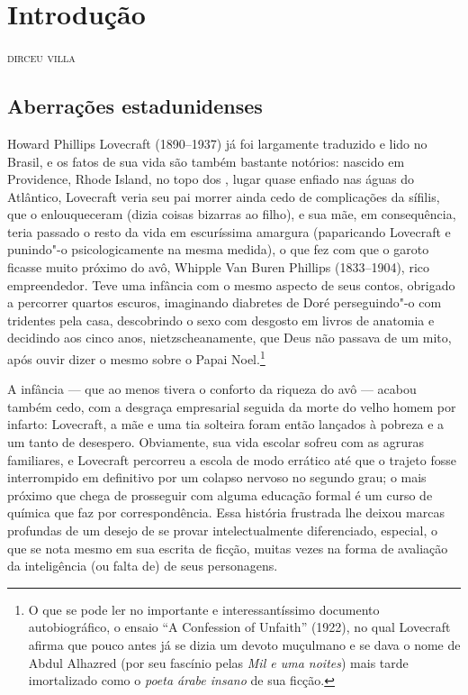 
\chapter[Introdução, \emph{por Dirceu Villa}]{Introdução}


\hfill\textsc{dirceu villa}

\bigskip

\section{Aberrações estadunidenses}

Howard Phillips Lovecraft (1890--1937) já foi largamente traduzido e lido
no Brasil, e os fatos de sua vida são também bastante notórios: nascido
em Providence, Rhode Island, no topo dos , lugar quase enfiado nas
águas do Atlântico, Lovecraft veria seu pai morrer ainda cedo de
complicações da sífilis, que o enlouqueceram (dizia coisas bizarras ao
filho), e sua mãe, em consequência, teria passado o resto da vida em
escuríssima amargura (paparicando Lovecraft e punindo"-o psicologicamente
na mesma medida), o que fez com que o garoto ficasse muito próximo do
avô, Whipple Van Buren Phillips (1833--1904), rico empreendedor. Teve uma
infância com o mesmo aspecto de seus contos, obrigado a percorrer
quartos escuros, imaginando diabretes de Doré perseguindo"-o com
tridentes pela casa, descobrindo o sexo com desgosto em livros de
anatomia e decidindo aos cinco anos, nietzscheanamente, que Deus não
passava de um mito, após ouvir dizer o mesmo sobre o Papai
Noel.\footnote{O que se pode ler no importante e interessantíssimo
  documento autobiográfico, o ensaio ``A Confession of Unfaith'' (1922),
  no qual Lovecraft afirma que pouco antes já se dizia um devoto
  muçulmano e se dava o nome de Abdul Alhazred (por seu fascínio pelas
  \emph{Mil e uma noites}) mais tarde imortalizado como o \emph{poeta
  árabe insano} de sua ficção.}

A infância --- que ao menos tivera o conforto da riqueza do avô ---
acabou também cedo, com a desgraça empresarial seguida da morte do velho
homem por infarto: Lovecraft, a mãe e uma tia solteira foram então
lançados à pobreza e a um tanto de desespero. Obviamente, sua vida
escolar sofreu com as agruras familiares, e Lovecraft percorreu a escola
de modo errático até que o trajeto fosse interrompido em definitivo por
um colapso nervoso no segundo grau; o mais próximo que chega de
prosseguir com alguma educação formal é um curso de química que faz por
correspondência. Essa história frustrada lhe deixou marcas profundas de
um desejo de se provar intelectualmente diferenciado, especial, o que se
nota mesmo em sua escrita de ficção, muitas vezes na forma de avaliação
da inteligência (ou falta de) de seus personagens.

